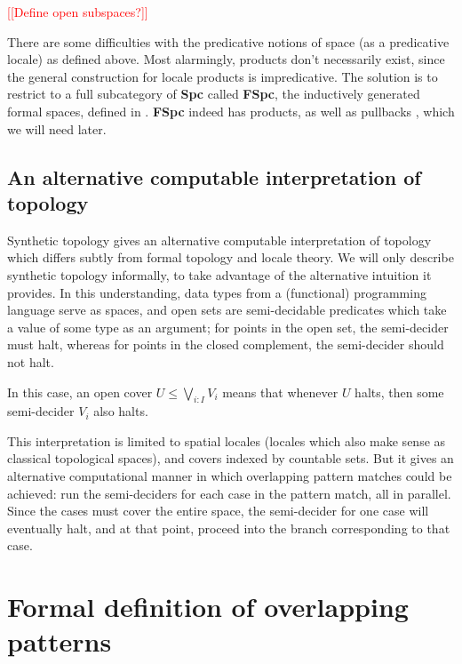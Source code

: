 \documentclass[conference]{IEEEtran}
\newcommand{\note}[1]{\textcolor{red}{[[{#1}]]}}
\begin{document}
\note{Define open subspaces?}

There are some difficulties with the predicative notions of space (as a predicative locale) as defined above. Most alarmingly, products don't necessarily exist, since the general construction for locale products is impredicative. The solution is to restrict to a full subcategory of \textbf{Spc} called \textbf{FSpc}, the inductively generated formal spaces, defined in \cite{coquand2003}. \textbf{FSpc} indeed has products, as well as pullbacks \cite{palmgren2003}, which we will need later.

\subsection{An alternative computable interpretation of topology}

Synthetic topology \cite{escardo2004, lesnik} gives an alternative computable interpretation of topology which differs subtly from formal topology and locale theory. We will only describe synthetic topology informally, to take advantage of the alternative intuition it provides. In this understanding, data types from a (functional) programming language serve as spaces, and open sets are semi-decidable predicates which take a value of some type as an argument; for points in the open set, the semi-decider must halt, whereas for points in the closed complement, the semi-decider should not halt.

In this case, an open cover $U \le \bigvee_{i : I} V_i$ means that whenever $U$ halts, then some semi-decider $V_i$ also halts.

This interpretation is limited to spatial locales (locales which also make sense as classical topological spaces), and covers indexed by countable sets. But it gives an alternative computational manner in which overlapping pattern matches could be achieved: run the semi-deciders for each case in the pattern match, all in parallel. Since the cases must cover the entire space, the semi-decider for one case will eventually halt, and at that point, proceed into the branch corresponding to that case.

\section{Formal definition of overlapping patterns}
\end{document}
